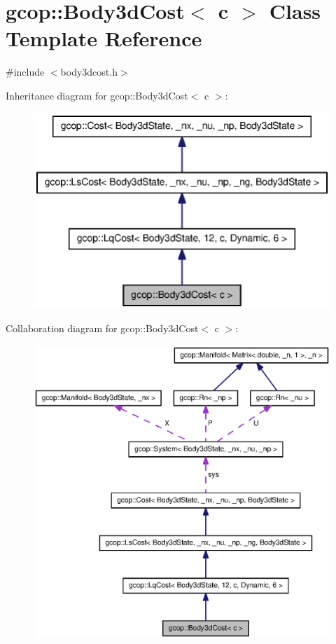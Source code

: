 \section{gcop\-:\-:\-Body3d\-Cost$<$ c $>$ \-Class \-Template \-Reference}
\label{classgcop_1_1Body3dCost}


{\ttfamily \#include $<$body3dcost.\-h$>$}



\-Inheritance diagram for gcop\-:\-:\-Body3d\-Cost$<$ c $>$\-:
\nopagebreak
\begin{figure}[H]
\begin{center}
\leavevmode
\includegraphics[width=342pt]{classgcop_1_1Body3dCost__inherit__graph}
\end{center}
\end{figure}


\-Collaboration diagram for gcop\-:\-:\-Body3d\-Cost$<$ c $>$\-:
\nopagebreak
\begin{figure}[H]
\begin{center}
\leavevmode
\includegraphics[width=350pt]{classgcop_1_1Body3dCost__coll__graph}
\end{center}
\end{figure}
